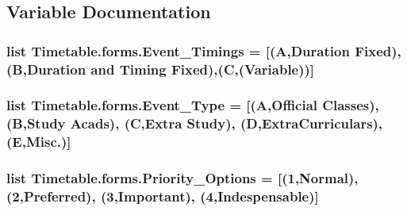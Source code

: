 \subsection{Variable Documentation}
\subsubsection[{\texorpdfstring{Event\+\_\+\+Timings}{Event_Timings}}]{\setlength{\rightskip}{0pt plus 5cm}list Timetable.\+forms.\+Event\+\_\+\+Timings = \mbox{[}(\textquotesingle{}A\textquotesingle{},\textquotesingle{}Duration Fixed\textquotesingle{}),(\textquotesingle{}B\textquotesingle{},\textquotesingle{}Duration and Timing Fixed\textquotesingle{}),(\textquotesingle{}C\textquotesingle{},(\textquotesingle{}Variable\textquotesingle{}))\mbox{]}}\hypertarget{namespaceTimetable_1_1forms_a9349dbc57784c724259804258b4258d7}{}\label{namespaceTimetable_1_1forms_a9349dbc57784c724259804258b4258d7}
\subsubsection[{\texorpdfstring{Event\+\_\+\+Type}{Event_Type}}]{\setlength{\rightskip}{0pt plus 5cm}list Timetable.\+forms.\+Event\+\_\+\+Type = \mbox{[}(\textquotesingle{}A\textquotesingle{},\textquotesingle{}Official Classes\textquotesingle{}), (\textquotesingle{}B\textquotesingle{},\textquotesingle{}Study Acads\textquotesingle{}), (\textquotesingle{}C\textquotesingle{},\textquotesingle{}Extra Study\textquotesingle{}), (\textquotesingle{}D\textquotesingle{},\textquotesingle{}Extra\+Curriculars\textquotesingle{}),(\textquotesingle{}E\textquotesingle{},\textquotesingle{}Misc.\textquotesingle{})\mbox{]}}\hypertarget{namespaceTimetable_1_1forms_ae8313e494f0d85b1d37ee0e3f9d9ed43}{}\label{namespaceTimetable_1_1forms_ae8313e494f0d85b1d37ee0e3f9d9ed43}
\subsubsection[{\texorpdfstring{Priority\+\_\+\+Options}{Priority_Options}}]{\setlength{\rightskip}{0pt plus 5cm}list Timetable.\+forms.\+Priority\+\_\+\+Options = \mbox{[}(\textquotesingle{}1\textquotesingle{},\textquotesingle{}Normal\textquotesingle{}),(\textquotesingle{}2\textquotesingle{},\textquotesingle{}Preferred\textquotesingle{}), (\textquotesingle{}3\textquotesingle{},\textquotesingle{}Important\textquotesingle{}), (\textquotesingle{}4\textquotesingle{},\textquotesingle{}Indespensable\textquotesingle{})\mbox{]}}\hypertarget{namespaceTimetable_1_1forms_a553ad34240a528cecce56d6a1f4267e5}{}\label{namespaceTimetable_1_1forms_a553ad34240a528cecce56d6a1f4267e5}
